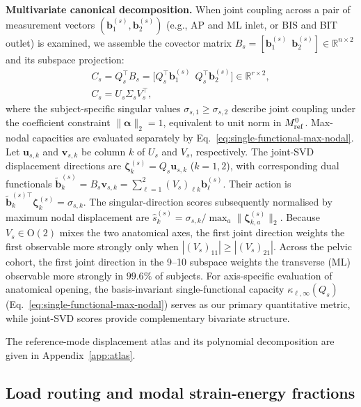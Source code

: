 \documentclass[pdflatex,sn-basic]{sn-jnl}
\begin{document}
\noindent\textbf{Multivariate canonical decomposition.}
When joint coupling across a pair of measurement vectors $(\mathbf b_1^{(s)}, \mathbf b_2^{(s)})$ (e.g., AP and ML inlet, or BIS and BIT outlet) is examined, we assemble the covector matrix $B_s = [\mathbf b_1^{(s)}\ \ \mathbf b_2^{(s)}] \in \mathbb R^{n \times 2}$ and its subspace projection:
\begin{equation}
\begin{gathered}
C_s = Q_s^\top B_s = \big[Q_s^\top\mathbf b_1^{(s)}\ \ Q_s^\top\mathbf b_2^{(s)}\big] \in \mathbb R^{r \times 2}, \\
 C_s = U_s \Sigma_s V_s^\top,
\label{eq:canonical-proj}
\end{gathered}
\end{equation}
where the subject-specific singular values $\sigma_{s,1}\ge\sigma_{s,2}$ describe joint coupling under the coefficient constraint $\|\boldsymbol\alpha\|_2=1$, equivalent to unit norm in $M_{\rm ref}^0$. Max-nodal capacities are evaluated separately by Eq.~\eqref{eq:single-functional-max-nodal}.
Let $\mathbf u_{s,k}$ and $\mathbf v_{s,k}$ be column $k$ of $U_s$ and $V_s$, respectively. The joint-SVD displacement directions are $\boldsymbol\zeta_k^{(s)}=Q_s\mathbf u_{s,k}$ ($k=1,2$), with corresponding dual functionals $\widetilde{\mathbf b}_k^{(s)}=B_s\mathbf v_{s,k}=\sum_{\ell=1}^{2}(V_s)_{\ell k}\mathbf b_\ell^{(s)}$. Their action is $\widetilde{\mathbf b}_k^{(s)\top}\boldsymbol\zeta_k^{(s)}=\sigma_{s,k}$.
The singular-direction scores subsequently normalised by maximum nodal displacement are $\widehat s_k^{(s)}=\sigma_{s,k}/\max_a\|\boldsymbol\zeta_{k,a}^{(s)}\|_2$.
Because $V_s\in\mathrm O(2)$ mixes the two anatomical axes, the first joint direction weights the first observable more strongly only when $|(V_s)_{11}|\ge |(V_s)_{21}|$. Across the pelvic cohort, the first joint direction in the 9--10 subspace weights the transverse (ML) observable more strongly in $99.6\%$ of subjects.
For axis-specific evaluation of anatomical opening, the basis-invariant single-functional capacity $\kappa_{\ell,\infty}(Q_s)$ (Eq.~\eqref{eq:single-functional-max-nodal}) serves as our primary quantitative metric, while joint-SVD scores provide complementary bivariate structure.

The reference-mode displacement atlas and its polynomial decomposition are given in Appendix~\ref{app:atlas}.

\subsection{Load routing and modal strain-energy fractions}
\label{sec:routing-methods}
\end{document}
